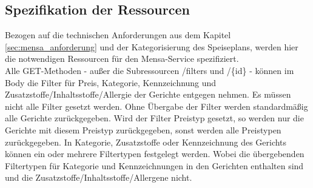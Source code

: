 \subsection*{Spezifikation der Ressourcen}
\label{sec:mensa_api}
Bezogen auf die technischen Anforderungen aus dem Kapitel \ref{sec:mensa_anforderung} und der Kategorisierung des Speiseplans, werden hier die notwendigen Ressourcen für den Mensa-Service spezifiziert.
\\
\linebreak
Alle GET-Methoden - außer die Subressourcen /filters und /\{id\} - können im Body die Filter für Preis, Kategorie, Kennzeichnung und Zusatzstoffe/Inhaltsstoffe/Allergie der Gerichte entgegen nehmen. Es müssen nicht alle Filter gesetzt werden. Ohne Übergabe der Filter werden standardmäßig alle Gerichte zurückgegeben. Wird der Filter Preistyp gesetzt, so werden nur die Gerichte mit diesem Preistyp zurückgegeben, sonst werden alle Preistypen zurückgegeben. In Kategorie, Zusatzstoffe oder Kennzeichnung des Gerichts können ein oder mehrere Filtertypen festgelegt werden. Wobei die übergebenden Filtertypen für Kategorie und Kennzeichnungen in den Gerichten enthalten sind und die Zusatzstoffe/Inhaltsstoffe/Allergene nicht. 
